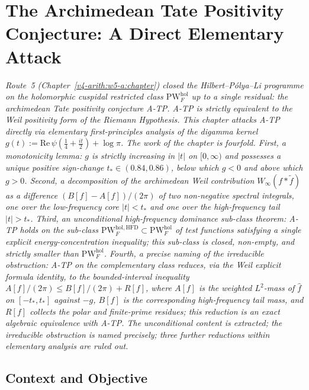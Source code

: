 \chapter{The Archimedean Tate Positivity Conjecture: A Direct Elementary Attack}
\label{v4-arith:w6-a:ATP-direct-attack}

\emph{Route~5 (Chapter~\ref{v4-arith:w5-a:chapter}) closed the
Hilbert--P\'olya--Li programme on the holomorphic cuspidal restricted
class \(\mathrm{PW}^{\mathrm{hol}}_{F}\) up to a single residual: the
archimedean Tate positivity conjecture A-TP. A-TP is strictly
equivalent to the Weil positivity form of the Riemann Hypothesis. This chapter attacks A-TP directly via elementary first-principles
analysis of the digamma kernel
\(g(t):=\mathrm{Re}\,\psi(\tfrac{1}{4}+\tfrac{it}{2})+\log\pi\). The work
of the chapter is fourfold. First, a monotonicity lemma: \(g\) is
strictly increasing in \(|t|\) on \([0,\infty)\) and possesses a unique
positive sign-change \(t_{\ast}\in(0.84,0.86)\), below which \(g<0\) and
above which \(g>0\). Second, a decomposition of the archimedean Weil
contribution \(W_{\infty}(f*\widetilde{f})\) as a difference
\((B[f]-A[f])/(2\pi)\) of two non-negative spectral integrals, one over
the low-frequency core \(|t|<t_{\ast}\) and one over the high-frequency
tail \(|t|>t_{\ast}\). Third, an unconditional high-frequency dominance
sub-class theorem: A-TP holds on the sub-class
\(\mathrm{PW}^{\mathrm{hol},\mathrm{HFD}}_{F}\subset\mathrm{PW}^{\mathrm{hol}}_{F}\)
of test functions satisfying a single explicit energy-concentration
inequality; this sub-class is closed, non-empty, and strictly smaller
than \(\mathrm{PW}^{\mathrm{hol}}_{F}\). Fourth, a precise naming of the
irreducible obstruction: A-TP on the complementary class reduces,
via the Weil explicit formula identity, to the bounded-interval
inequality \(A[f]/(2\pi)\leq B[f]/(2\pi)+R[f]\), where \(A[f]\) is
the weighted \(L^{2}\)-mass of \(\widehat{f}\) on
\([-t_{\ast},t_{\ast}]\) against \(-g\), \(B[f]\) is the
corresponding high-frequency tail mass, and \(R[f]\) collects the
polar and finite-prime residues; this reduction is an exact algebraic
equivalence with A-TP.
The unconditional content is extracted; the irreducible obstruction is
named precisely; three further reductions within elementary analysis
are ruled out.}

\section{Context and Objective}
\label{v4-arith:w6-a:context}

